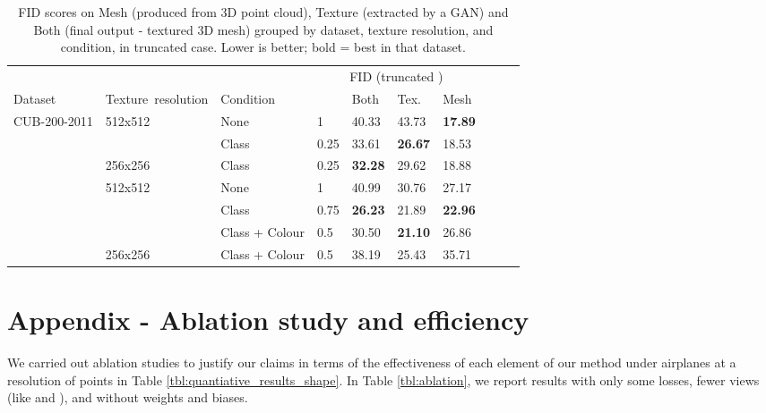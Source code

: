 \documentclass[runningheads]{llncs}
\begin{document}
\begin{table}[hbt!]
\vspace{-0.5mm}
\caption{FID scores on Mesh (produced from 3D point cloud), Texture (extracted by a GAN) and Both (final output - textured 3D mesh) grouped by dataset, texture resolution, and condition, in truncated case. Lower is better; bold = best in that dataset.}
\label{tbl:main-results}
\vspace{-1.5mm}
\centering
\renewcommand{\arraystretch}{1.15}
{
\begin{tabular}{l|l|l|llll|lll}
                     &                          &              & \multicolumn{4}{c|}{FID (truncated )}                          & \multicolumn{3}{c}{}              \\
Dataset              & Texture\ resolution            & Condition &  & Both           & Tex.        & Mesh  \\ \hline\hline
\multirow{4}{*}{CUB-200-2011} & \multirow{2}{*}{512x512} & None         & 1        & 40.33          & 43.73          & \textbf{17.89}  \\
                     &                          & Class        & 0.25     & 33.61          & \textbf{26.67}          & 18.53
                     \\ \cline{2-10} 
                     & 256x256                  & Class        & 0.25     & \textbf{32.28}          & 29.62          & 18.88      \\ \hline\hline
\multirow{4}{*}{Pascal3D+} & \multirow{3}{*}{512x512} & None         & 1        & 40.99          & 30.76          & 27.17                  \\
                     &                          & Class        & 0.75     & \textbf{26.23} & 21.89          & \textbf{22.96} \\
                     &                          & Class + Colour  & 0.5      & 30.50          & \textbf{21.10} & 26.86          \\ \cline{2-10} 
                     & 256x256                  & Class + Colour  & 0.5      & 38.19          & 25.43          & 35.71    
\end{tabular}
}
\vspace{-2.5mm}
\end{table}

\FloatBarrier


\section{Appendix - Ablation study and efficiency}
We carried out ablation studies to justify our claims in terms of the effectiveness of each element of our method under airplanes at a resolution of  points in Table \ref{tbl:quantiative_results_shape}. In Table \ref{tbl:ablation}, we report results with only some losses, fewer views (like  and ), and without weights and biases.
\end{document}
